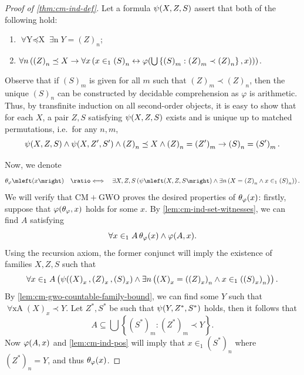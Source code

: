 \documentclass[12pt,openany]{book}
\theoremstyle{plain}
\theoremstyle{definition}
\newcommand\uplabel[1]{\textup{(#1)}}
\newcommand\opA[1]{\mathop{\forall #1}}
\newcommand\opE[1]{\mathop{\exists #1}}
\newcommand\defeqv{\quad \ratio\Longleftrightarrow \quad}
\begin{document}
\begin{proof}[Proof of \autoref{thm:cm-ind-def}]
  Let a formula $\psi\mleft(X, Z, S\mright)$ assert that both of the following hold:
  \begin{enumerate}[label=\uplabel{\roman*}]
    \item $\opA{Y \preceq X} \opE{n} Y = \left(Z\right)_n$;
    \item \label{itm:cm-ind-def-iter} $\opA{n} \left(\left(Z\right)_n \preceq X \rightarrow \opA{x} \left(x \in_1 \left(S\right)_n \leftrightarrow \varphi\mleft(\bigcup \left\{\left(S\right)_m : \left(Z\right)_m \prec \left(Z\right)_n\right\}, x\mright)\right)\right)$.
  \end{enumerate}
  Observe that if $\left(S\right)_m$ is given for all $m$ such that $\left(Z\right)_m \prec \left(Z\right)_n$, then the unique $\left(S\right)_n$ can be constructed by decidable comprehension as $\varphi$ is arithmetic. Thus, by transfinite induction on all second-order objects, it is easy to show that for each $X$, a pair $Z, S$ satisfying $\psi\mleft(X, Z, S\mright)$ exists and is unique up to matched permutations, i.e.\ for any $n, m$,
  \[\psi\mleft(X, Z, S\mright) \land \psi\mleft(X, Z', S'\mright) \land \left(Z\right)_n \preceq X \land \left(Z\right)_n = \left(Z'\right)_m \rightarrow \left(S\right)_n = \left(S'\right)_m.\]

  Now, we denote
  \[\theta_\varphi\mleft(x\mright) \defeqv \opE{X, Z, S} \left(\psi\mleft(X, Z, S\mright) \land \opE{n} \left(X = \left(Z\right)_n \land x \in_1 \left(S\right)_n\right)\right).\]
  We will verify that $\mathrm{CM} + \mathrm{GWO}$ proves the desired properties of $\theta_\varphi\mleft(x\mright)$: firstly, suppose that $\varphi\mleft(\theta_\varphi, x\mright)$ holds for some $x$. By \autoref{lem:cm-ind-set-witnesses}, we can find $A$ satisfying
  \[\opA{x \in_1 A} \theta_\varphi\mleft(x\mright) \land \varphi\mleft(A, x\mright).\]
  Using the recursion axiom, the former conjunct will imply the existence of families $X, Z, S$ such that
  \[\opA{x \in_1 A} \left(\psi\mleft(\left(X\right)_x, \left(Z\right)_x, \left(S\right)_x\mright) \land \opE{n} \left(\left(X\right)_x = \left(\left(Z\right)_x\right)_n \land x \in_1 \left(\left(S\right)_x\right)_n\right)\right).\]
  By \autoref{lem:cm-gwo-countable-family-bound}, we can find some $Y$ such that $\opA{x \in_1 A} \left(X\right)_x \prec Y$. Let $Z^*, S^*$ be such that $\psi\mleft(Y, Z^*, S^*\mright)$ holds, then it follows that
  \[A \subseteq \bigcup \left\{\left(S^*\right)_m : \left(Z^*\right)_m \prec Y\right\}.\]
  Now $\varphi\mleft(A, x\mright)$ and \autoref{lem:cm-ind-pos} will imply that $x \in_1 \left(S^*\right)_n$ where $\left(Z^*\right)_n = Y$, and thus $\theta_\varphi\mleft(x\mright)$.


\end{proof}
\end{document}

